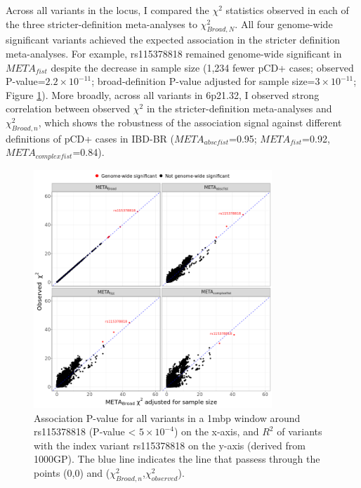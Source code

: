 Across all variants in the locus, I compared the $\chi^{2}$ statistics observed in each of the three stricter-definition meta-analyses to $\chi^{2}_{Broad,N}$. All four genome-wide significant variants achieved the expected association in the stricter definition meta-analyses. For example, rs115378818 remained genome-wide significant in $META_{fist}$ despite the decrease in sample size (1,234 fewer pCD+ cases; observed P-value=$2.2\times10^{-11}$; broad-definition P-value adjusted for sample size=$3\times10^{-11}$; Figure \ref{fig:meta_def_comparison}). More broadly, across all variants in 6p21.32, I observed strong correlation between observed $\chi^{2}$ in the stricter-definition meta-analyses and $\chi^{2}_{Broad,n}$, which shows the robustness of the association signal against different definitions of pCD+ cases in IBD-BR ($META_{abscfist}$=0.95; $META_{fist}$=0.92,$META_{complexfist}$=0.84). 

\begin{figure}[H] 
  \centering    
  \includegraphics[width=0.8\textwidth]{Vector/meta_chisq_plot}
  \caption[$\chi^{2}$ of genome-wide significant SNPs with different pCD definitions]{Association P-value for all variants in a 1mbp window around rs115378818 (P-value < $5\times10^{-4}$) on the x-axis, and $R^{2}$ of variants with the index variant rs115378818 on the y-axis (derived from 1000GP). The blue line indicates the line that passess through the points (0,0) and ($\chi^{2}_{Broad,n}$,$\chi^{2}_{observed}$).}
  \label{fig:meta_def_comparison}
  \end{figure}

